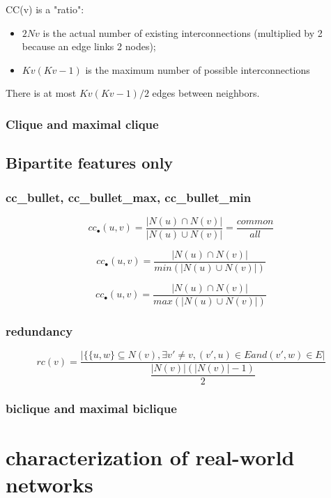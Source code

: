 \documentclass[table]{report}
\begin{document}
\noindent
CC(v) is a "ratio":

\begin{itemize}[noitemsep]
    \item $2Nv$ is the actual number of existing interconnections (multiplied by 2 because an edge links 2 nodes);
    \item $Kv(Kv-1)$ is the maximum number of possible interconnections
\end{itemize}

\noindent
There is at most $Kv(Kv-1)/2$ edges between neighbors.

\subsubsection{Clique and maximal clique}

\subsection{Bipartite features only}
\subsubsection{cc\_bullet, cc\_bullet\_max, cc\_bullet\_min}


$$cc_{\bullet}(u,v)=\dfrac{|N(u)\cap N(v)|}
						  {|N(u)\cup N(v)|} = \dfrac{common}{all}$$
						  
$$cc_{\bullet}(u,v)=\dfrac{|N(u)\cap N(v)|}
						  {min(|N(u)\cup N(v)|)}$$
		
$$cc_{\bullet}(u,v)=\dfrac{|N(u)\cap N(v)|}
						  {max(|N(u)\cup N(v)|)}$$
						  				  
\subsubsection{redundancy}

$$rc(v)= \dfrac{|\{\{u,w\} \subseteq N(v), \exists v' \neq v, (v',u) \in E and (v',w) \in E|}{\dfrac{|N(v)| (|N(v)|-1)}{2}}$$


\subsubsection{biclique and maximal biclique}

\section{characterization of real-world networks}
\end{document}
